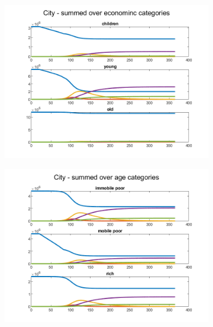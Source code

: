 \documentclass{article}
\begin{document}
\begin{figure}[H]
	\begin{subfigure}[b]{0.5\textwidth}
		\includegraphics[width=\textwidth]{no-economic-effect/weak-mitigation/City-age-cat}
	\end{subfigure}%
	\begin{subfigure}[b]{0.5\textwidth}
		\includegraphics[width=\textwidth]{no-economic-effect/weak-mitigation/City-eco-cat}
	\end{subfigure}


\end{figure}
\end{document}
